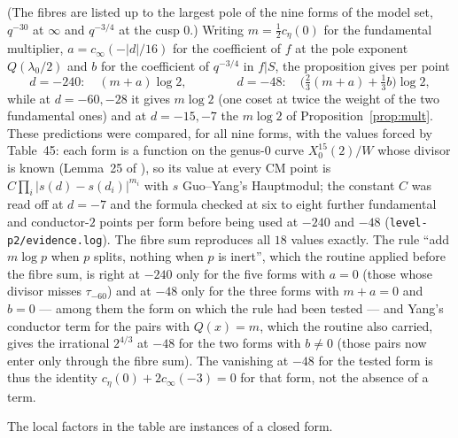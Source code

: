 \documentclass[11pt,reqno]{amsart}
\theoremstyle{plain}
\theoremstyle{definition}
\begin{document}
(The fibres are listed up to the largest pole of the nine forms of the model set, $q^{-30}$ at
$\infty$ and $q^{-3/4}$ at the cusp $0$.) Writing $m=\tfrac12c_\eta(0)$ for the fundamental
multiplier, $a=c_\infty(-\lvert d\rvert/16)$ for the coefficient of $f$ at the pole exponent
$Q(\lambda_0/2)$ and $b$ for the coefficient of $q^{-3/4}$ in $f|S$, the proposition gives per point
\[
  d=-240:\quad (m+a)\log2,\qquad\qquad d=-48:\quad \bigl(\tfrac23(m+a)+\tfrac13 b\bigr)\log2 ,
\]
while at $d=-60,-28$ it gives $m\log2$ (one coset at twice the weight of the two fundamental ones)
and at $d=-15,-7$ the $m\log2$ of Proposition~\ref{prop:mult}. These predictions were compared, for
all nine forms, with the values forced by Table~45: each form is a function on the genus-$0$ curve
$X_0^{15}(2)/W$ whose divisor is known (Lemma~25 of \cite{GY}), so its value at every CM point is
$C\prod_i\lvert s(d)-s(d_i)\rvert^{m_i}$ with $s$ Guo--Yang's Hauptmodul; the constant $C$ was read
off at $d=-7$ and the formula checked at six to eight further fundamental and conductor-$2$ points per
form before being used at $-240$ and $-48$ (\texttt{level-p2/evidence.log}). The fibre sum
reproduces all $18$ values exactly. The rule ``add $m\log p$ when $p$ splits, nothing when $p$ is
inert'', which the routine applied before the fibre sum, is right at $-240$ only for the five forms with
$a=0$ (those whose divisor misses $\tau_{-60}$) and at $-48$ only for the three forms with
$m+a=0$ and $b=0$ --- among them the form on which the rule had been tested --- and Yang's conductor
term for the pairs with $Q(x)=m$, which the routine also carried, gives the irrational $2^{4/3}$ at
$-48$ for the two forms with $b\neq0$ (those pairs now enter only through the fibre sum). The vanishing at $-48$ for the tested form is thus the
identity $c_\eta(0)+2c_\infty(-3)=0$ for that form, not the absence of a term.

The local factors in the table are instances of a closed form.
\end{document}
